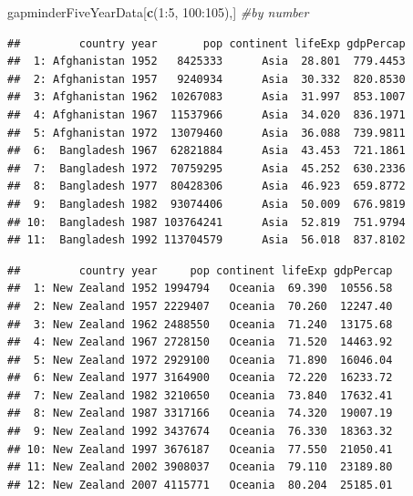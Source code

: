 \documentclass[]{article}
\newenvironment{Shaded}{\begin{snugshade}}{\end{snugshade}}
\newcommand{\KeywordTok}[1]{\textcolor[rgb]{0.13,0.29,0.53}{\textbf{{#1}}}}
\newcommand{\DecValTok}[1]{\textcolor[rgb]{0.00,0.00,0.81}{{#1}}}
\newcommand{\StringTok}[1]{\textcolor[rgb]{0.31,0.60,0.02}{{#1}}}
\newcommand{\CommentTok}[1]{\textcolor[rgb]{0.56,0.35,0.01}{\textit{{#1}}}}
\newcommand{\NormalTok}[1]{{#1}}
\begin{document}
\begin{Shaded}
\begin{Highlighting}[]
\NormalTok{gapminderFiveYearData[}\KeywordTok{c}\NormalTok{(}\DecValTok{1}\NormalTok{:}\DecValTok{5}\NormalTok{, }\DecValTok{100}\NormalTok{:}\DecValTok{105}\NormalTok{),] }\CommentTok{#by number}
\end{Highlighting}
\end{Shaded}

\begin{verbatim}
##         country year       pop continent lifeExp gdpPercap
##  1: Afghanistan 1952   8425333      Asia  28.801  779.4453
##  2: Afghanistan 1957   9240934      Asia  30.332  820.8530
##  3: Afghanistan 1962  10267083      Asia  31.997  853.1007
##  4: Afghanistan 1967  11537966      Asia  34.020  836.1971
##  5: Afghanistan 1972  13079460      Asia  36.088  739.9811
##  6:  Bangladesh 1967  62821884      Asia  43.453  721.1861
##  7:  Bangladesh 1972  70759295      Asia  45.252  630.2336
##  8:  Bangladesh 1977  80428306      Asia  46.923  659.8772
##  9:  Bangladesh 1982  93074406      Asia  50.009  676.9819
## 10:  Bangladesh 1987 103764241      Asia  52.819  751.9794
## 11:  Bangladesh 1992 113704579      Asia  56.018  837.8102
\end{verbatim}

\begin{Shaded}
\end{Shaded}

\begin{verbatim}
##         country year     pop continent lifeExp gdpPercap
##  1: New Zealand 1952 1994794   Oceania  69.390  10556.58
##  2: New Zealand 1957 2229407   Oceania  70.260  12247.40
##  3: New Zealand 1962 2488550   Oceania  71.240  13175.68
##  4: New Zealand 1967 2728150   Oceania  71.520  14463.92
##  5: New Zealand 1972 2929100   Oceania  71.890  16046.04
##  6: New Zealand 1977 3164900   Oceania  72.220  16233.72
##  7: New Zealand 1982 3210650   Oceania  73.840  17632.41
##  8: New Zealand 1987 3317166   Oceania  74.320  19007.19
##  9: New Zealand 1992 3437674   Oceania  76.330  18363.32
## 10: New Zealand 1997 3676187   Oceania  77.550  21050.41
## 11: New Zealand 2002 3908037   Oceania  79.110  23189.80
## 12: New Zealand 2007 4115771   Oceania  80.204  25185.01
\end{verbatim}
\end{document}
